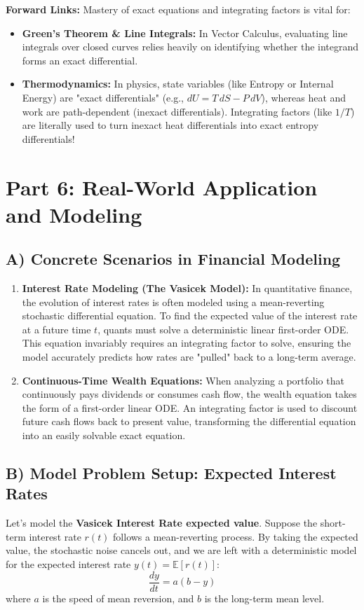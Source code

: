 \documentclass[11pt]{article}
\begin{document}
\textbf{Forward Links:} Mastery of exact equations and integrating factors is vital for:
\begin{itemize}
    \item \textbf{Green's Theorem \& Line Integrals:} In Vector Calculus, evaluating line integrals over closed curves relies heavily on identifying whether the integrand forms an exact differential.
    \item \textbf{Thermodynamics:} In physics, state variables (like Entropy or Internal Energy) are "exact differentials" (e.g., $dU = T \, dS - P \, dV$), whereas heat and work are path-dependent (inexact differentials). Integrating factors (like $1/T$) are literally used to turn inexact heat differentials into exact entropy differentials!
\end{itemize}

\section{Part 6: Real-World Application and Modeling}

\subsection{A) Concrete Scenarios in Financial Modeling}
\begin{enumerate}
    \item \textbf{Interest Rate Modeling (The Vasicek Model):} In quantitative finance, the evolution of interest rates is often modeled using a mean-reverting stochastic differential equation. To find the expected value of the interest rate at a future time $t$, quants must solve a deterministic linear first-order ODE. This equation invariably requires an integrating factor to solve, ensuring the model accurately predicts how rates are "pulled" back to a long-term average.
    \item \textbf{Continuous-Time Wealth Equations:} When analyzing a portfolio that continuously pays dividends or consumes cash flow, the wealth equation takes the form of a first-order linear ODE. An integrating factor is used to discount future cash flows back to present value, transforming the differential equation into an easily solvable exact equation.
\end{enumerate}

\subsection{B) Model Problem Setup: Expected Interest Rates}
Let's model the \textbf{Vasicek Interest Rate expected value}.
Suppose the short-term interest rate $r(t)$ follows a mean-reverting process. By taking the expected value, the stochastic noise cancels out, and we are left with a deterministic model for the expected interest rate $y(t) = \mathbb{E}[r(t)]$:
\[ \frac{dy}{dt} = a(b - y) \]
where $a$ is the speed of mean reversion, and $b$ is the long-term mean level. 
\end{document}
